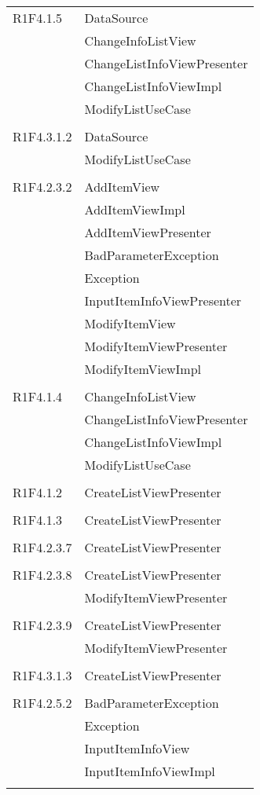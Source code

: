 \begin{center}
\begin{longtable}{|p{7cm}|p{5cm}|}
		R1F4.1.5 & DataSource \\ & ChangeInfoListView \\ & ChangeListInfoViewPresenter \\ & ChangeListInfoViewImpl \\ & ModifyListUseCase \\ & \\ \hline
		R1F4.3.1.2 & DataSource \\ & ModifyListUseCase \\ & \\ \hline
		R1F4.2.3.2 & AddItemView \\ & AddItemViewImpl \\ & AddItemViewPresenter \\ & BadParameterException \\ & Exception \\ & InputItemInfoViewPresenter \\ & ModifyItemView \\ & ModifyItemViewPresenter \\ & ModifyItemViewImpl \\ & \\ \hline
		R1F4.1.4 & ChangeInfoListView \\ & ChangeListInfoViewPresenter \\ & ChangeListInfoViewImpl \\ & ModifyListUseCase \\ & \\ \hline
		R1F4.1.2 & CreateListViewPresenter \\ & \\ \hline
		R1F4.1.3 & CreateListViewPresenter \\ & \\ \hline
		R1F4.2.3.7 & CreateListViewPresenter \\ & \\ \hline
		R1F4.2.3.8 & CreateListViewPresenter \\ & ModifyItemViewPresenter \\ & \\ \hline
		R1F4.2.3.9 & CreateListViewPresenter \\ & ModifyItemViewPresenter \\ & \\ \hline
		R1F4.3.1.3 & CreateListViewPresenter \\ & \\ \hline
		R1F4.2.5.2 & BadParameterException \\ & Exception \\ & InputItemInfoView \\ & InputItemInfoViewImpl \\ & \\ \hline

\end{longtable}
\end{center}
